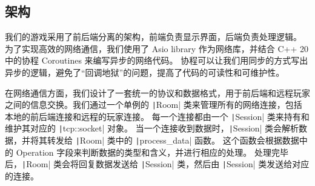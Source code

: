 \documentclass[UTF8]{ctexart}
\begin{document}
\subsection{架构}

我们的游戏采用了前后端分离的架构，前端负责显示界面，后端负责处理逻辑。
为了实现高效的网络通信，我们使用了 Asio library 作为网络库，并结合 C++ 20 中的协程 Coroutines 来编写异步的网络代码。
协程可以让我们用同步的方式写出异步的逻辑，避免了“回调地狱”的问题，提高了代码的可读性和可维护性。\par 

在网络通信方面，我们设计了一套统一的协议和数据格式，用于前后端和远程玩家之间的信息交换。我们通过一个单例的 \texttt|Room| 类来管理所有的网络连接，包括本地的前后端连接和远程的玩家连接。
每一个连接都由一个 \texttt|Session| 类来持有和维护其对应的 \texttt|tcp::socket| 对象。
当一个连接收到数据时，\texttt|Session| 类会解析数据，并将其转发给 \texttt|Room| 类中的 \texttt|process_data| 函数。
这个函数会根据数据中的 Operation 字段来判断数据的类型和含义，并进行相应的处理。
处理完毕后，\texttt|Room| 类会将回复数据发送给 \texttt|Session| 类，然后由 \texttt|Session| 类发送给对应的连接。
\end{document}
